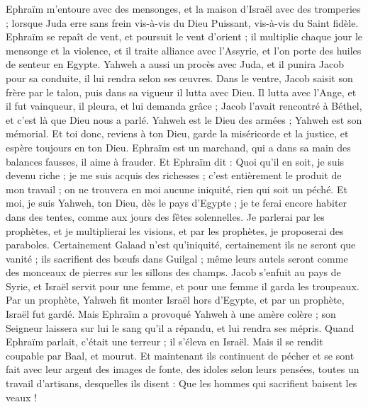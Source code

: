 \begin{multicols}{2}
\VerseOne{}Ephraïm m'entoure avec des mensonges, et la maison d'Israël avec des tromperies ; lorsque Juda erre sans frein vis-à-vis du Dieu Puissant, vis-à-vis du Saint fidèle.
Ephraïm se repaît de vent, et poursuit le vent d'orient ; il multiplie chaque jour le mensonge et la violence, et il traite alliance avec l'Assyrie, et l'on porte des huiles de senteur en Egypte.
Yahweh a aussi un procès avec Juda, et il punira Jacob pour sa conduite, il lui rendra selon ses œuvres.
Dans le ventre, Jacob saisit son frère par le talon, puis dans sa vigueur il lutta avec Dieu.
Il lutta avec l'Ange, et il fut vainqueur, il pleura, et lui demanda grâce ; Jacob l'avait rencontré à Béthel, et c'est là que Dieu nous a parlé.
Yahweh est le Dieu des armées ; Yahweh est son mémorial.
Et toi donc, reviens à ton Dieu, garde la miséricorde et la justice, et espère toujours en ton Dieu.
Ephraïm est un marchand, qui a dans sa main des balances fausses, il aime à frauder.
Et Ephraïm dit : Quoi qu'il en soit, je suis devenu riche ; je me suis acquis des richesses ; c'est entièrement le produit de mon travail ; on ne trouvera en moi aucune iniquité, rien qui soit un péché.
Et moi, je suis Yahweh, ton Dieu, dès le pays d'Egypte ; je te ferai encore habiter dans des tentes, comme aux jours des fêtes solennelles.
Je parlerai par les prophètes, et je multiplierai les visions, et par les prophètes, je proposerai des paraboles.
Certainement Galaad n'est qu'iniquité, certainement ils ne seront que vanité ; ils sacrifient des bœufs dans Guilgal ; même leurs autels seront comme des monceaux de pierres sur les sillons des champs.
Jacob s'enfuit au pays de Syrie, et Israël servit pour une femme, et pour une femme il garda les troupeaux.
Par un prophète, Yahweh fit monter Israël hors d'Egypte, et par un prophète, Israël fut gardé.
Mais Ephraïm a provoqué Yahweh à une amère colère ; son Seigneur laissera sur lui le sang qu'il a répandu, et lui rendra ses mépris.
\VerseOne{}Quand Ephraïm parlait, c'était une terreur ; il s'éleva en Israël. Mais il se rendit coupable par Baal, et mourut.
Et maintenant ils continuent de pécher et se sont fait avec leur argent des images de fonte, des idoles selon leurs pensées, toutes un travail d'artisans, desquelles ils disent : Que les hommes qui sacrifient baisent les veaux !

\end{multicols}
